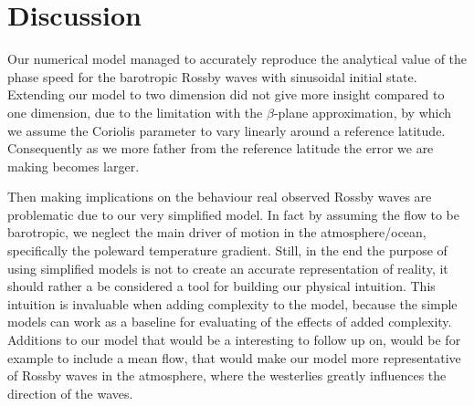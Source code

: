 \section{Discussion}

Our numerical model managed to accurately reproduce the analytical value of the
phase speed for the barotropic Rossby waves with sinusoidal initial state.
Extending our model to two dimension did not give more insight compared to
 one dimension, due to the limitation with the $\beta$-plane approximation, by
which we assume the Coriolis parameter to vary linearly around a reference
latitude. Consequently as we more father from the reference latitude the error
we are making becomes larger. 

Then making implications on the behaviour real 
observed Rossby waves are problematic due to our very simplified model. In fact
by assuming the flow to be barotropic, we neglect the main driver of
motion in the atmosphere/ocean, specifically the poleward
temperature gradient. Still, in the end the purpose of using simplified models
is not to create an accurate representation of reality, it should rather a be
considered a tool for building our physical intuition. This intuition is
invaluable when adding complexity to the model, because the simple models can
work as a baseline for evaluating of the effects of added complexity.
Additions to our model that would be a interesting to follow up on, would be for
example to include a mean flow, that would make our model more representative of
Rossby waves in the atmosphere, where the westerlies greatly influences the
direction of the waves.  